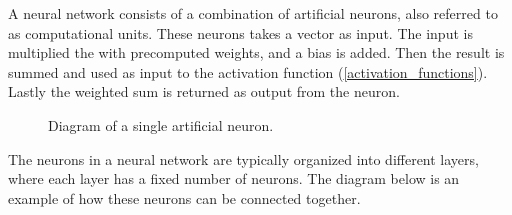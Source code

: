 
A neural network consists of a combination of artificial neurons, also referred to as computational units. These neurons takes a vector as input. The input is multiplied the with precomputed weights, and a bias is added. Then the result is summed and used as input to the activation function (\ref{activation_functions}). Lastly the weighted sum is returned as output from the neuron. \parencite{_cs231n_????} \parencite{_multi-layer_????}



\begin{figure}[H]
  \centering
    \caption{Diagram of a single artificial neuron.} %
    \label{fig:single_neuron}

\end{figure}

The neurons in a neural network are typically organized into different layers, where each layer has a fixed number of neurons. The diagram below is an example of how these neurons can be connected together.


